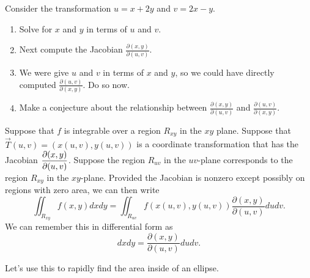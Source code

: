 \begin{problem}
Consider the transformation $u=x+2y$ and $v=2x-y$.  
\begin{enumerate}
	\item Solve for $x$ and $y$ in terms of $u$ and $v$. 
	\item Next compute the Jacobian $\frac{\partial (x,y)}{\partial (u,v)}$.
	\item We were give $u$ and $v$ in terms of $x$ and $y$, so we could have directly computed $\frac{\partial (u,v)}{\partial (x,y)}$. Do so now.
	\item Make a conjecture about the relationship between $\frac{\partial (x,y)}{\partial (u,v)}$ and $\frac{\partial (u,v)}{\partial (x,y)}$. 
\end{enumerate}
\end{problem}

\begin{theorem}
 Suppose that $f$ is integrable over a region $R_{xy}$ in the $xy$ plane. Suppose that $\vec T(u,v)=(x(u,v),y(u,v))$ is a coordinate transformation that has the Jacobian $\displaystyle \frac{\partial (x,y)}{\partial (u,v)} $. Suppose the region $R_{uv}$ in the $uv$-plane corresponds to the region $R_{xy}$ in the $xy$-plane. Provided the Jacobian is nonzero except possibly on regions with zero area, we can then write  
$$\iint_{R_{xy}} f(x,y) dxdy = \iint_{R_{uv}} f(x(u,v),y(u,v)) \frac{\partial (x,y)}{\partial (u,v)} dudv.$$
 We can remember this in differential form as 
$$dxdy = \frac{\partial (x,y)}{\partial (u,v)} dudv.$$
\end{theorem}

Let's use this to rapidly find the area inside of an ellipse.

